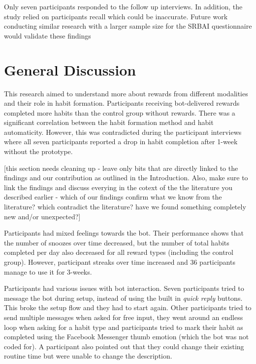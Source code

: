 \documentclass{scaffold/sigchi}
\begin{document}
Only seven participants responded to the follow up interviews. In addition, the study relied on participants recall which could be inaccurate. Future work conducting similar research with a larger sample size for the SRBAI questionnaire would validate these findings

\section{General Discussion}
This research aimed to understand more about rewards from different modalities and their role in habit formation. Participants receiving bot-delivered rewards completed more habits than the control group without rewards. There was a significant correlation between the habit formation method and habit automaticity. However, this was contradicted during the participant interviews where all seven participants reported a drop in habit completion after 1-week without the prototype.

[this section needs cleaning up - leave only bits that are directly linked to the findings and our contribution as outlined in the Introduction. Also, make sure to link the findings and discuss everying in the cotext of the the literature you described earlier - which of our findings confirm what we know from the literature? which contradict the literature? have we found something completely new and/or unexpected?]



Participants had mixed feelings towards the bot. Their performance shows that the number of snoozes over time decreased, but the number of total habits completed per day also decreased for all reward types (including the control group). However, participant streaks over time increased and 36 participants manage to use it for 3-weeks.

Participants had various issues with bot interaction. Seven participants tried to message the bot during setup, instead of using the built in \textit{quick reply} buttons. This broke the setup flow and they had to start again. Other participants tried to send multiple messages when asked for free input, they went around an endless loop when asking for a habit type and participants tried to mark their habit as completed using the Facebook Messenger thumb emotion (which the bot was not coded for). A participant also pointed out that they could change their existing routine time but were unable to change the description.
\end{document}
